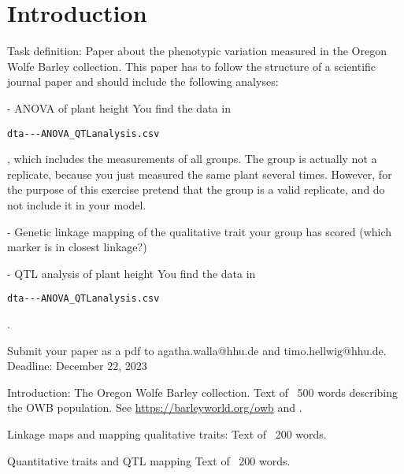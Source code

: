 \section{Introduction}

Task definition:
Paper about the phenotypic variation measured in the Oregon Wolfe Barley collection. This paper has to follow the structure of a scientific journal paper and should include the following analyses:

- ANOVA of plant height
You find the data in \begin{verbatim}dta---ANOVA_QTLanalysis.csv\end{verbatim}, which includes the measurements of all groups. The group is actually not a replicate, because you just measured the same plant several times. However, for the purpose of this exercise pretend that the group is a valid replicate, and do not include it in your model.

- Genetic linkage mapping of the qualitative trait your group has scored (which marker is in closest linkage?)

- QTL analysis of plant height
You find the data in \begin{verbatim}dta---ANOVA_QTLanalysis.csv\end{verbatim}.

Submit your paper as a pdf to agatha.walla@hhu.de and timo.hellwig@hhu.de.
Deadline: December 22, 2023

Introduction:
The Oregon Wolfe Barley collection. Text of ~500 words describing the OWB population. See \url{https://barleyworld.org/owb} and \autocite{doi:10.1007/s001220100622}.

Linkage maps and mapping qualitative traits:
Text of ~200 words.

Quantitative traits and QTL mapping
Text of ~200 words.
